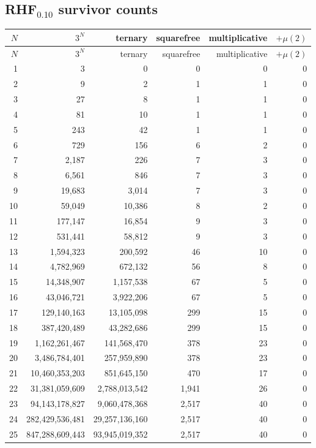 \documentclass[11pt]{article}
\begin{document}
\subsection{RHF$_{0.10}$ survivor counts}
\begin{center}\scriptsize\begin{longtable}{r r r r r r}
\toprule $N$ & $3^N$ & ternary & squarefree & multiplicative & $+\mu(2)$\\ \midrule\endfirsthead
\toprule $N$ & $3^N$ & ternary & squarefree & multiplicative & $+\mu(2)$\\ \midrule\endhead
1 & 3 & 0 & 0 & 0 & 0\\
2 & 9 & 2 & 1 & 1 & 0\\
3 & 27 & 8 & 1 & 1 & 0\\
4 & 81 & 10 & 1 & 1 & 0\\
5 & 243 & 42 & 1 & 1 & 0\\
6 & 729 & 156 & 6 & 2 & 0\\
7 & 2{,}187 & 226 & 7 & 3 & 0\\
8 & 6{,}561 & 846 & 7 & 3 & 0\\
9 & 19{,}683 & 3{,}014 & 7 & 3 & 0\\
10 & 59{,}049 & 10{,}386 & 8 & 2 & 0\\
11 & 177{,}147 & 16{,}854 & 9 & 3 & 0\\
12 & 531{,}441 & 58{,}812 & 9 & 3 & 0\\
13 & 1{,}594{,}323 & 200{,}592 & 46 & 10 & 0\\
14 & 4{,}782{,}969 & 672{,}132 & 56 & 8 & 0\\
15 & 14{,}348{,}907 & 1{,}157{,}538 & 67 & 5 & 0\\
16 & 43{,}046{,}721 & 3{,}922{,}206 & 67 & 5 & 0\\
17 & 129{,}140{,}163 & 13{,}105{,}098 & 299 & 15 & 0\\
18 & 387{,}420{,}489 & 43{,}282{,}686 & 299 & 15 & 0\\
19 & 1{,}162{,}261{,}467 & 141{,}568{,}470 & 378 & 23 & 0\\
20 & 3{,}486{,}784{,}401 & 257{,}959{,}890 & 378 & 23 & 0\\
21 & 10{,}460{,}353{,}203 & 851{,}645{,}150 & 470 & 17 & 0\\
22 & 31{,}381{,}059{,}609 & 2{,}788{,}013{,}542 & 1{,}941 & 26 & 0\\
23 & 94{,}143{,}178{,}827 & 9{,}060{,}478{,}368 & 2{,}517 & 40 & 0\\
24 & 282{,}429{,}536{,}481 & 29{,}257{,}136{,}160 & 2{,}517 & 40 & 0\\
25 & 847{,}288{,}609{,}443 & 93{,}945{,}019{,}352 & 2{,}517 & 40 & 0\\
\bottomrule\end{longtable}\end{center}
\end{document}
